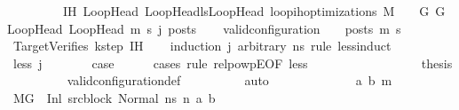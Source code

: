 \begin{isabellebody}
\ \ \ \ \ \ \ \ \ IH{\isacharcolon}{\kern0pt}\ {\isachardoublequoteopen}{\isasymforall}{\isacharparenleft}{\kern0pt}LoopHead{\isacharcomma}{\kern0pt}\ LoopHead{\isacharprime}{\kern0pt}{\isacharparenright}{\kern0pt}{\isasymin}lsLoopHead{\isachardot}{\kern0pt}\ loop{\isacharunderscore}{\kern0pt}ih{\isacharunderscore}{\kern0pt}optimizations\ M\ {\isasymLambda}\ {\isasymGamma}\ {\isasymOmega}\ G\ G{\isacharprime}{\kern0pt}\ LoopHead\ LoopHead{\isacharprime}{\kern0pt}\ m{\isacharprime}{\kern0pt}\ s{\isacharprime}{\kern0pt}\ j\ posts{\isachardoublequoteclose}\isanewline
\ \ \isamarkupfalse%
\ {\isachardoublequoteopen}valid{\isacharunderscore}{\kern0pt}configuration\ {\isasymLambda}\ {\isasymGamma}\ {\isasymOmega}\ posts\ m{\isacharprime}{\kern0pt}\ s{\isacharprime}{\kern0pt}{\isachardoublequoteclose}\ \isamarkupfalse%
\ TargetVerifies\ k{\isacharunderscore}{\kern0pt}step\ IH\isanewline
\ \ \isamarkupfalse%
\ {\isacharparenleft}{\kern0pt}induction\ j\ arbitrary{\isacharcolon}{\kern0pt}\ ns\ rule{\isacharcolon}{\kern0pt}\ less{\isacharunderscore}{\kern0pt}induct{\isacharparenright}{\kern0pt}\isanewline
\ \ \ \ \isamarkupfalse%
\ {\isacharparenleft}{\kern0pt}less\ j{\isacharparenright}{\kern0pt}\isanewline
\ \ \ \ \isamarkupfalse%
\ \isamarkupfalse%
\ {\isacharquery}{\kern0pt}case\isanewline
\ \ \ \ \isamarkupfalse%
\ {\isacharparenleft}{\kern0pt}cases\ rule{\isacharcolon}{\kern0pt}\ relpowp{\isacharunderscore}{\kern0pt}E{}{\isacharunderscore}{\kern0pt}{}{\isacharbrackleft}{\kern0pt}OF\ less{\isacharparenleft}{\kern0pt}{}{\isacharparenright}{\kern0pt}{\isacharbrackright}{\kern0pt}{\isacharparenright}{\kern0pt}\isanewline
\ \ \ \ \ \ \isamarkupfalse%
\ {}\isanewline
\ \ \ \ \ \ \isamarkupfalse%
\ \isamarkupfalse%
\ {\isacharquery}{\kern0pt}thesis\isanewline
\ \ \ \ \ \ \ \ \isamarkupfalse%
\ valid{\isacharunderscore}{\kern0pt}configuration{\isacharunderscore}{\kern0pt}def\isanewline
\ \ \ \ \ \ \ \ \isamarkupfalse%
\ auto\isanewline
\ \ \ \ \isamarkupfalse%
\isanewline
\ \ \ \ \ \ \isamarkupfalse%
\ {\isacharparenleft}{\kern0pt}{}\ a\ b\ m{\isacharparenright}{\kern0pt}\isanewline
\ \ \ \ \ \ \isamarkupfalse%
\ {\isacartoucheopen}M{\isacharcomma}{\kern0pt}{\isasymLambda}{\isacharcomma}{\kern0pt}{\isasymGamma}{\isacharcomma}{\kern0pt}{\isasymOmega}{\isacharcomma}{\kern0pt}G\ {\isasymturnstile}\ {\isacharparenleft}{\kern0pt}Inl\ src{\isacharunderscore}{\kern0pt}block{\isacharcomma}{\kern0pt}\ Normal\ ns{\isacharparenright}{\kern0pt}\ {\isacharminus}{\kern0pt}n{\isasymrightarrow}\ {\isacharparenleft}{\kern0pt}a{\isacharcomma}{\kern0pt}\ b{\isacharparenright}{\kern0pt}{\isacartoucheclose}\ \isamarkupfalse%

\end{isabellebody}

